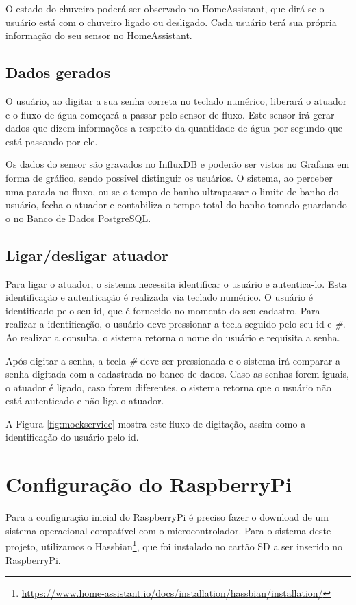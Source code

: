 O estado do chuveiro poderá ser observado no HomeAssistant, que dirá se o usuário está com o chuveiro ligado ou desligado. Cada usuário terá sua própria informação do seu sensor no HomeAssistant.

\subsection{Dados gerados}

O usuário, ao digitar a sua senha correta no teclado numérico, liberará o atuador e o fluxo de água começará a passar pelo sensor de fluxo. Este sensor irá gerar dados que dizem informações a respeito da quantidade de água por segundo que está passando por ele.

Os dados do sensor são gravados no InfluxDB e poderão ser vistos no Grafana em forma de gráfico, sendo possível distinguir os usuários. O sistema, ao perceber uma parada no fluxo, ou se o tempo de banho ultrapassar o limite de banho do usuário, fecha o atuador e contabiliza o tempo total do banho tomado guardando-o no Banco de Dados PostgreSQL.

\subsection{Ligar/desligar atuador}

Para ligar o atuador, o sistema necessita identificar o usuário e autentica-lo. Esta identificação e autenticação é realizada via teclado numérico. O usuário é identificado pelo seu id, que é fornecido no momento do seu cadastro. Para realizar a identificação, o usuário deve pressionar a tecla \textit{\*} seguido pelo seu id e \textit{\#}. Ao realizar a consulta, o sistema retorna o nome do usuário e requisita a senha.

Após digitar a senha, a tecla \textit{\#} deve ser pressionada e o sistema irá comparar a senha digitada com a cadastrada no banco de dados. Caso as senhas forem iguais, o atuador é ligado, caso forem diferentes, o sistema retorna que o usuário não está autenticado e não liga o atuador. 

A Figura \ref{fig:mockservice} mostra este fluxo de digitação, assim como a identificação do usuário pelo id.

\section{Configuração do RaspberryPi} \label{sec:confrasp}

Para a configuração inicial do RaspberryPi é preciso fazer o download de um sistema operacional compatível com o microcontrolador. Para o sistema deste projeto, utilizamos o Hassbian\footnote{\url{https://www.home-assistant.io/docs/installation/hassbian/installation/}}, que foi instalado no cartão SD a ser inserido no RaspberryPi.


